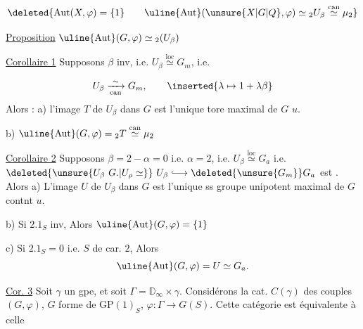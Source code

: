 
\[
\deleted{\mathrm{Aut}(X,\varphi)=\{1\}\qquad\uline{\mathrm{Aut}}(\unsure{X|G|Q},\varphi)\simeq{}_2U_\beta\overset{\text{can}}{\simeq}\mu_2}
\]

\uline{Proposition} $\uline{\mathrm{Aut}}(G,\varphi)\simeq {}_2(U_\beta)$

\uline{Corollaire 1} Supposons $\beta$  inv, i.e. $U_\beta\overset{\text{loc}}{\simeq}G_m$, i.e.


\[
U_\beta\xrightarrow[\text{can}]{\sim}G_m,\qquad \inserted{\lambda\mapsto1+\lambda\beta}
\]
Alors : a) l'image $T$ de $U_\beta$ dans $G$ est l'unique tore maximal de $G$  $u$. 

b) $\uline{\mathrm{Aut}}(G,\varphi)={}_2T\overset{\text{can}}{\simeq}\mu_2$


\uline{Corollaire 2} Supposons $\beta=2-\alpha=0$ i.e. $\alpha=2$, i.e. $U_\beta\overset{\text{loc}}{\simeq}G_a$ i.e. $\deleted{\unsure{U_\beta\ G.|U_\rho\simeq}}\ U_\beta\lhook\joinrel\longrightarrow\deleted{\unsure{G_m}}G_a$  est . Alors a) L'image $U$ de $U_\beta$ dans $G$ est l'unique  ss groupe unipotent maximal de $G$ contnt $u$.

b) Si $2.1_S$ inv, Alors $\uline{\mathrm{Aut}}(G,\varphi)=\{1\}$

c) Si $2.1_S=0$ i.e. $S$ de car. $2$, Alors
\[
\uline{\mathrm{Aut}}(G,\varphi)=U\simeq G_a.
\]

\uline{Cor. 3} Soit $\gamma$ un gpe, et soit $\Gamma=\mathbb D_\infty\times\gamma$. Considérons la cat. $C(\gamma)$ des couples $(G,\varphi)$, $G$ forme de $\mathrm{GP}(1)_S$, $\varphi:\Gamma\longrightarrow G(S)$. Cette catégorie est équivalente à celle
